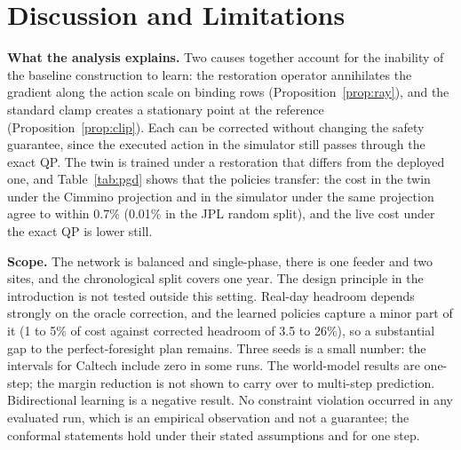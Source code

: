 \documentclass[11pt]{article}
\begin{document}
\section{Discussion and Limitations}\label{sec:disc}
\textbf{What the analysis explains.} Two causes together account for the inability of the baseline construction to learn: the restoration operator annihilates the gradient along the action scale on binding rows (Proposition~\ref{prop:ray}), and the standard clamp creates a stationary point at the reference (Proposition~\ref{prop:clip}). Each can be corrected without changing the safety guarantee, since the executed action in the simulator still passes through the exact QP. The twin is trained under a restoration that differs from the deployed one, and Table~\ref{tab:pgd} shows that the policies transfer: the cost in the twin under the Cimmino projection and in the simulator under the same projection agree to within 0.7\% (0.01\% in the JPL random split), and the live cost under the exact QP is lower still.

\textbf{Scope.} The network is balanced and single-phase, there is one feeder and two sites, and the chronological split covers one year. The design principle in the introduction is not tested outside this setting. Real-day headroom depends strongly on the oracle correction, and the learned policies capture a minor part of it (1 to 5\% of cost against corrected headroom of 3.5 to 26\%), so a substantial gap to the perfect-foresight plan remains. Three seeds is a small number: the intervals for Caltech include zero in some runs. The world-model results are one-step; the margin reduction is not shown to carry over to multi-step prediction. Bidirectional learning is a negative result. No constraint violation occurred in any evaluated run, which is an empirical observation and not a guarantee; the conformal statements hold under their stated assumptions and for one step.

\end{document}
